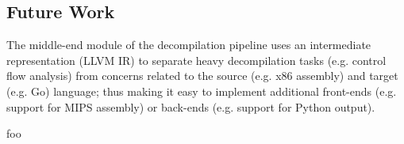 
\subsection{Future Work}

The middle-end module of the decompilation pipeline uses an intermediate representation (LLVM IR) to separate heavy decompilation tasks (e.g. control flow analysis) from concerns related to the source (e.g. x86 assembly) and target (e.g. Go) language; thus making it easy to implement additional front-ends (e.g. support for MIPS assembly) or back-ends (e.g. support for Python output).











foo
